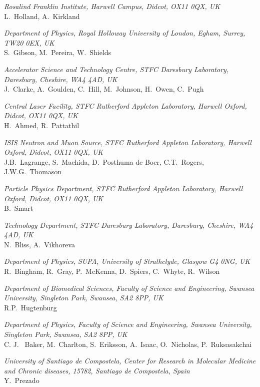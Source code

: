 \vspace{0.5cm}
\noindent \textit{Rosalind Franklin Institute, Harwell Campus, Didcot, OX11 0QX, UK} \\
L.~Holland, A.~Kirkland
 
\vspace{0.5cm}
\noindent \textit{Department of Physics, Royal Holloway University of London, Egham, Surrey, TW20 0EX, UK} \\
S.~Gibson, M.~Pereira, W.~Shields
 
\vspace{0.5cm}
\noindent \textit{Accelerator Science and Technology Centre, STFC Daresbury Laboratory, Daresbury, Cheshire, WA4 4AD, UK} \\
J.~Clarke, A.~Goulden, C.~Hill, M.~Johnson, H.~Owen, C.~Pugh
 
\vspace{0.5cm}
\noindent \textit{Central Laser Facility, STFC Rutherford Appleton Laboratory, Harwell Oxford, Didcot, OX11 0QX, UK} \\
H.~Ahmed, R.~Pattathil
 
\vspace{0.5cm}
\noindent \textit{ISIS Neutron and Muon Source, STFC Rutherford Appleton Laboratory, Harwell Oxford, Didcot, OX11 0QX, UK} \\
J.B.~Lagrange, S.~Machida, D.~Posthuma de Boer, C.T.~Rogers, J.W.G.~Thomason
 
\vspace{0.5cm}
\noindent \textit{Particle Physics Department, STFC Rutherford Appleton Laboratory, Harwell Oxford, Didcot, OX11 0QX, UK} \\
B.~Smart
 
\vspace{0.5cm}
\noindent \textit{Technology Department, STFC Daresbury Laboratory, Daresbury, Cheshire, WA4 4AD, UK} \\
N.~Bliss, A.~Vikhoreva
 
\vspace{0.5cm}
\noindent \textit{Department of Physics, SUPA, University of Strathclyde, Glasgow G4 0NG, UK} \\
R.~Bingham, R.~Gray, P.~McKenna, D.~Spiers, C.~Whyte, R.~Wilson
 
\vspace{0.5cm}
\noindent \textit{Department of Biomedical Sciences, Faculty of Science and Engineering, Swansea University, Singleton Park, Swansea, SA2 8PP, UK} \\
R.P.~Hugtenburg
 
\vspace{0.5cm}
\noindent \textit{Department of Physics, Faculty of Science and Engineering, Swansea University, Singleton Park, Swansea, SA2 8PP, UK} \\
C. J. ~Baker, M.~Charlton, S.~Eriksson, A.~Isaac, O.~Nicholas, P.~Ruksasakchai
 
\vspace{0.5cm}
\noindent \textit{University of Santiago de Compostela, Center for Research in Molecular Medicine and Chronic diseases, 15782, Santiago de Compostela, Spain} \\
Y.~Prezado
 
\vspace{0.5cm}
